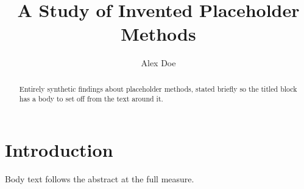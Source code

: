\documentclass{article}
\title{A Study of Invented Placeholder Methods}
\author{Alex Doe}
\begin{document}
\maketitle

\begin{abstract}
Entirely synthetic findings about placeholder methods, stated briefly so
the titled block has a body to set off from the text around it.
\end{abstract}

\section{Introduction}
Body text follows the abstract at the full measure.
\end{document}
